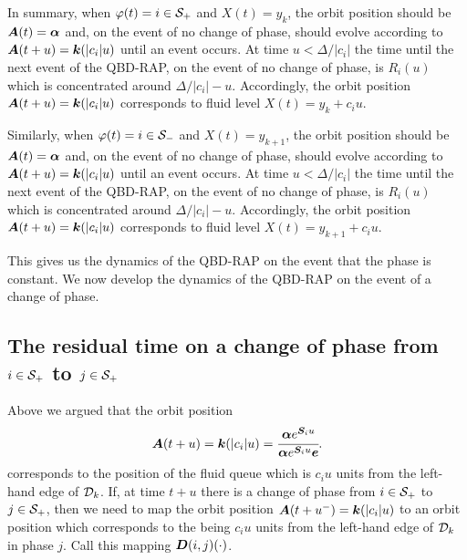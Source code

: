 In summary, when \(\varphi(t)=i\in\mathcal{S}_+\) and \(X(t)=y_k\), the orbit position should be \(\boldsymbol A(t)=\boldsymbol\alpha\) and, on the event of no change of phase, should evolve according to \(\boldsymbol A(t+u)=\boldsymbol k(|c_i|u)\) until an event occurs. At time \(u<\Delta/|c_i|\) the time until the next event of the QBD-RAP, on the event of no change of phase, is \(R_i(u)\) which is concentrated around \(\Delta/|c_i|-u\). Accordingly, the orbit position \(\boldsymbol A(t+u)=\boldsymbol k(|c_i|u)\) corresponds to fluid level \(X(t) = y_k+c_iu\). 

Similarly, when \(\varphi(t)=i\in\mathcal{S}_-\) and \(X(t)=y_{k+1}\), the orbit position should be \(\boldsymbol A(t)=\boldsymbol\alpha\) and, on the event of no change of phase, should evolve according to \(\boldsymbol A(t+u)=\boldsymbol k(|c_i|u)\) until an event occurs. At time \(u<\Delta/|c_i|\) the time until the next event of the QBD-RAP, on the event of no change of phase, is \(R_i(u)\) which is concentrated around \(\Delta/|c_i|-u\). Accordingly, the orbit position \(\boldsymbol A(t+u)=\boldsymbol k(|c_i|u)\) corresponds to fluid level \(X(t) = y_{k+1}+c_iu\). 

This gives us the dynamics of the QBD-RAP on the event that the phase is constant. We now develop the dynamics of the QBD-RAP on the event of a change of phase. 

\subsection{The residual time on a change of phase from \(i\in\mathcal{S}_+\) to \(j\in\mathcal{S}_+\)} 

Above we argued that the orbit position 
\begin{align}
	\boldsymbol A(t+u) = \boldsymbol k(|c_i|u) = \cfrac{\boldsymbol \alpha e^{\boldsymbol S_i u}}{\boldsymbol \alpha e^{\boldsymbol S_i u}\boldsymbol e}.\label{eqn: orbit i}
\end{align}
corresponds to the position of the fluid queue which is \(c_iu\) units from the left-hand edge of \(\mathcal{D}_k\).
If, at time \(t+u\) there is a change of phase from \(i\in\mathcal{S}_+\) to \(j\in\mathcal{S}_+\), then we need to map the orbit position \(\boldsymbol A(t+u^-) = \boldsymbol k(|c_i|u)\) to an orbit position which corresponds to the being \(c_iu\) units from the left-hand edge of \(\mathcal{D}_k\) in phase \(j\). Call this mapping \(\boldsymbol D(i,j)(\cdot)\). 

